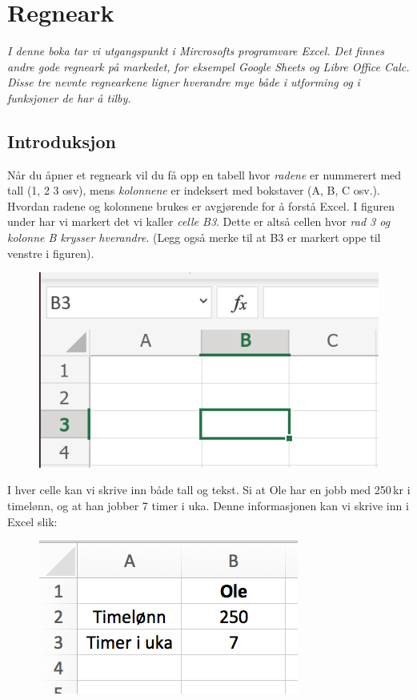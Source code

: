




\section{Regneark}

\textit{I denne boka tar vi utgangspunkt i Mircrosofts programvare Excel. Det finnes andre gode regneark på markedet, for eksempel Google Sheets og Libre Office Calc. Disse tre nevnte regnearkene ligner hverandre mye både i utforming og i funksjoner de har å tilby.
} 

\subsection{Introduksjon}

Når du åpner et regneark vil du få opp en tabell hvor \textit{radene} er nummerert med tall (1, 2 3 osv), mens \textit{kolonnene} er indeksert med bokstaver (A, B, C osv.). Hvordan radene og kolonnene brukes er avgjørende for å forstå Excel. I figuren under har vi markert det vi kaller \textit{celle B\textsl{3}}. Dette er altså cellen hvor \textsl{rad 3 og kolonne B krysser hverandre}. (Legg også merke til at B3 er markert oppe til venstre i figuren).

\begin{figure}[H]
	\centering
	\includegraphics[scale=0.25]{figs/B3}
\end{figure}
I hver celle kan vi skrive inn både tall og tekst. Si at Ole har en jobb med 250\,kr i timelønn, og at han jobber 7 timer i uka. Denne informasjonen kan vi skrive inn i Excel slik:
\begin{figure}[H]
	\centering
	\includegraphics[scale=0.35]{figs/ex2}
\end{figure}
